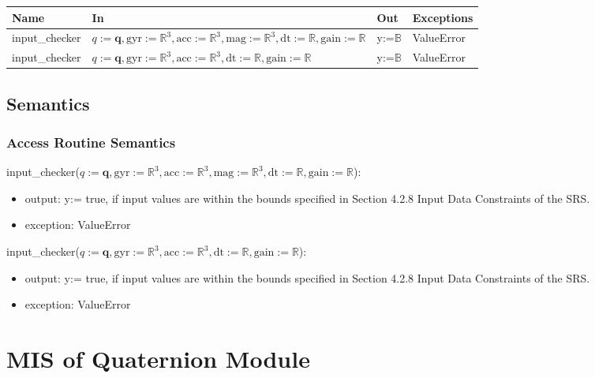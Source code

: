 \documentclass[12pt, titlepage]{article}
\begin{document}
\begin{center}
\begin{tabular}{p{3cm} p{8cm} p{1cm} p{2cm}}
\hline
\textbf{Name} & \textbf{In} & \textbf{Out} & \textbf{Exceptions} \\
\hline
input\_checker & $q:=\mathbf{q}, \text{gyr}:=\mathbb{R}^3, \text{acc}:=\mathbb{R}^3,
\text{mag}:=\mathbb{R}^3, \text{dt}:=\mathbb{R}, \text{gain}:= \mathbb{R}$ & y:=$\mathbb{B}$ &
ValueError \\
input\_checker & $q:=\mathbf{q}, \text{gyr}:=\mathbb{R}^3, \text{acc}:=\mathbb{R}^3,
\text{dt}:=\mathbb{R}, \text{gain}:= \mathbb{R}$ & y:=$\mathbb{B}$ & ValueError \\
\hline
\end{tabular}
\end{center}

\subsection{Semantics}


\subsubsection{Access Routine Semantics}

\noindent input\_checker($q:=\mathbf{q}, \text{gyr}:=\mathbb{R}^3, \text{acc}:=\mathbb{R}^3,
\text{mag}:=\mathbb{R}^3, \text{dt}:=\mathbb{R}, \text{gain}:= \mathbb{R}$):
\begin{itemize}
\item output: y:= true, if input values are within the bounds specified in Section 4.2.8 Input Data
Constraints of the SRS.
\item exception: ValueError
\end{itemize}

\noindent input\_checker($q:=\mathbf{q}, \text{gyr}:=\mathbb{R}^3, \text{acc}:=\mathbb{R}^3,
\text{dt}:=\mathbb{R}, \text{gain}:= \mathbb{R}$):
\begin{itemize}
\item output: y:= true, if input values are within the bounds specified in Section 4.2.8 Input Data
Constraints of the SRS.
\item exception: ValueError
\end{itemize}

\newpage

\section{MIS of Quaternion Module} \label{qm}
\end{document}
